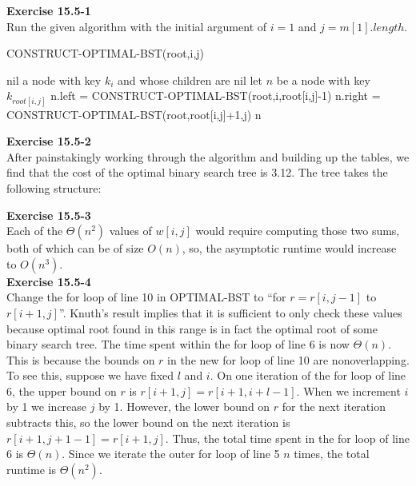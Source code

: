 \documentclass{article}
\begin{document}
\noindent\textbf{Exercise 15.5-1}\\

Run the given algorithm with the initial argument of $i=1$ and $j= m[1].length$.

\begin{algorithm}
\caption{CONSTRUCT-OPTIMAL-BST(root,i,j)}
\begin{algorithmic}
\State \Return nil
\EndIf
{}
\State \Return a node with key $k_i$ and whose children are nil
\EndIf
\State let $n$ be a node with key $k_{root[i,j]}$
\State n.left = CONSTRUCT-OPTIMAL-BST(root,i,root[i,j]-1)
\State n.right = CONSTRUCT-OPTIMAL-BST(root,root[i,j]+1,j)
\State \Return n
\end{algorithmic}
\end{algorithm}

\noindent\textbf{Exercise 15.5-2}\\

After painstakingly working through the algorithm and building up the tables, we find that the cost of the optimal binary search tree is 3.12.  The tree takes the following structure:


\noindent\textbf{Exercise 15.5-3}\\

Each of the $\Theta(n^2)$ values of $w[i,j]$ would require computing those two sums, both of which can be of size $O(n)$, so, the asymptotic runtime would increase to $O(n^3)$.\\

\noindent\textbf{Exercise 15.5-4}\\

Change the for loop of line 10 in OPTIMAL-BST to ``for $r = r[i,j-1]$ to $r[i+1,j]$''.  Knuth's result implies that it is sufficient to only check these values because optimal root found in this range is in fact the optimal root of some binary search tree.  The time spent within the for loop of line 6 is now $\Theta(n)$.  This is because the bounds on $r$ in the new for loop of line 10 are nonoverlapping.  To see this, suppose we have fixed $l$ and $i$.  On one iteration of the for loop of line 6, the upper bound on $r$ is $r[i+1,j] = r[i+1,i+l-1]$.  When we increment $i$ by 1 we increase $j$ by 1.  However, the lower bound on $r$ for the next iteration subtracts this, so the lower bound on the next iteration is $r[i+1,j+1-1] = r[i+1,j]$.  Thus, the total time spent in the for loop of line 6 is $\Theta(n)$.  Since we iterate the outer for loop of line 5 $n$ times, the total runtime is $\Theta(n^2)$.\\
\end{document}
